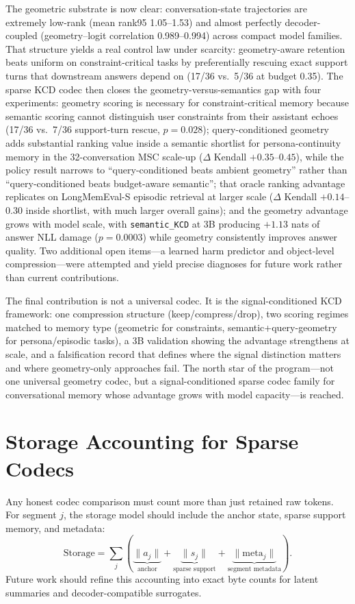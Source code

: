 \documentclass[conference]{IEEEtran}
\begin{document}
The geometric substrate is now clear: conversation-state trajectories are extremely low-rank (mean rank95 1.05--1.53) and almost perfectly decoder-coupled (geometry--logit correlation 0.989--0.994) across compact model families. That structure yields a real control law under scarcity: geometry-aware retention beats uniform on constraint-critical tasks by preferentially rescuing exact support turns that downstream answers depend on (17/36 vs.\ 5/36 at budget 0.35). The sparse KCD codec then closes the geometry-versus-semantics gap with four experiments: geometry scoring is necessary for constraint-critical memory because semantic scoring cannot distinguish user constraints from their assistant echoes (17/36 vs.\ 7/36 support-turn rescue, $p=0.028$); query-conditioned geometry adds substantial ranking value inside a semantic shortlist for persona-continuity memory in the 32-conversation MSC scale-up ($\Delta$ Kendall $+0.35$--$0.45$), while the policy result narrows to ``query-conditioned beats ambient geometry'' rather than ``query-conditioned beats budget-aware semantic''; that oracle ranking advantage replicates on LongMemEval-S episodic retrieval at larger scale ($\Delta$ Kendall $+0.14$--$0.30$ inside shortlist, with much larger overall gains); and the geometry advantage grows with model scale, with \texttt{semantic\_KCD} at 3B producing $+1.13$ nats of answer NLL damage ($p=0.0003$) while geometry consistently improves answer quality. Two additional open items---a learned harm predictor and object-level compression---were attempted and yield precise diagnoses for future work rather than current contributions.

The final contribution is not a universal codec. It is the signal-conditioned KCD framework: one compression structure (keep/compress/drop), two scoring regimes matched to memory type (geometric for constraints, semantic+query-geometry for persona/episodic tasks), a 3B validation showing the advantage strengthens at scale, and a falsification record that defines where the signal distinction matters and where geometry-only approaches fail. The north star of the program---not one universal geometry codec, but a signal-conditioned sparse codec family for conversational memory whose advantage grows with model capacity---is reached.

\appendices
\section{Storage Accounting for Sparse Codecs}
Any honest codec comparison must count more than just retained raw tokens. For segment $j$, the storage model should include the anchor state, sparse support memory, and metadata:
\begin{equation}
\mathrm{Storage} = \sum_j \left(
\underbrace{\lVert a_j \rVert}_{\text{anchor}}
+ \underbrace{\lVert s_j \rVert}_{\text{sparse support}}
+ \underbrace{\lVert \mathrm{meta}_j \rVert}_{\text{segment metadata}}
\right).
\end{equation}
Future work should refine this accounting into exact byte counts for latent summaries and decoder-compatible surrogates.
\end{document}
